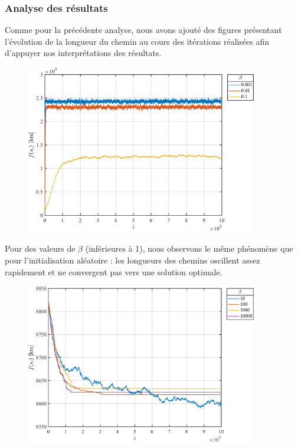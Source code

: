 \documentclass[a4paper, 12pt]{report}
\begin{document}
    \subsubsection{Analyse des résultats}
    Comme pour la précédente analyse, nous avons ajouté des figures présentant l'évolution de la longueur du chemin au cours des itérations réalisées afin d'appuyer nos interprétations des résultats.
    \begin{figure}[H]
        \centering
        \includegraphics[width=0.9\textwidth]{resources/pdf/belgium_bad_nna.pdf}
    \end{figure}
    Pour des valeurs de $\beta$ (inférieures à 1), nous observons le même phénomène que pour l'initialisation aléatoire : les longueurs des chemins oscillent assez rapidement et ne convergent pas vers une solution optimale.
    \begin{figure}[H]
        \centering
        \includegraphics[width=0.9\textwidth]{resources/pdf/belgium_fine_nna.pdf}
    \end{figure}
\end{document}
